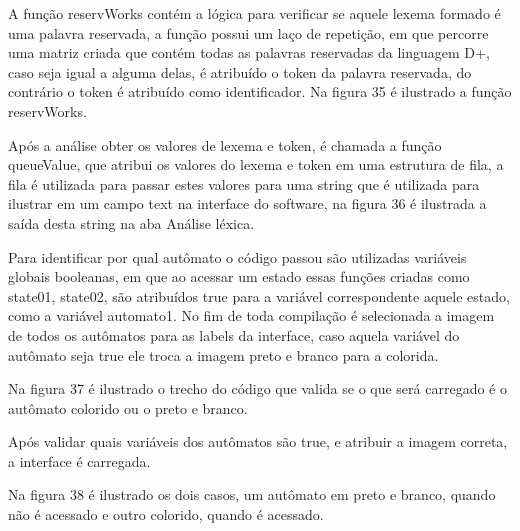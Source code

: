 \documentclass[12pt,oneside,a4paper,chapter=TITLE,section=TITLE,sumario=tradicional]{abntex2}
\begin{document}
A função reservWorks contém a lógica para verificar se aquele lexema formado é uma palavra reservada, a função possui um laço de repetição, em que percorre uma matriz criada que contém todas as palavras reservadas da linguagem D+, caso seja igual a alguma delas, é atribuído o token da palavra reservada, do contrário o token é atribuído como identificador. Na figura 35 é ilustrado a função reservWorks.

\begin{figure}[htb]
\end{figure} 

Após a análise obter os valores de lexema e token, é chamada a função queueValue, que atribui os valores do lexema e token em uma estrutura de fila, a fila é utilizada para passar estes valores para uma string que é utilizada para ilustrar em um campo text na interface do software, na figura 36 é ilustrada a saída desta string na aba Análise léxica.

\begin{figure}[htb]
\end{figure} 

Para identificar por qual autômato o código passou são utilizadas variáveis globais booleanas, em que ao acessar um estado essas funções criadas como state01, state02, são atribuídos true para a variável correspondente aquele estado, como a variável automato1. No fim de toda compilação é selecionada a imagem de todos os autômatos para as labels da interface, caso aquela variável do autômato seja true ele troca a imagem preto e branco para a colorida.  

Na figura 37 é ilustrado o trecho do código que valida se o que será carregado é o autômato colorido ou o preto e branco. 

\begin{figure}[htb]
\end{figure} 

Após validar quais variáveis dos autômatos são true, e atribuir a imagem correta, a interface é carregada. 

Na figura 38 é ilustrado os dois casos, um autômato em preto e branco, quando não é acessado e outro colorido, quando é acessado. 
\end{document}
